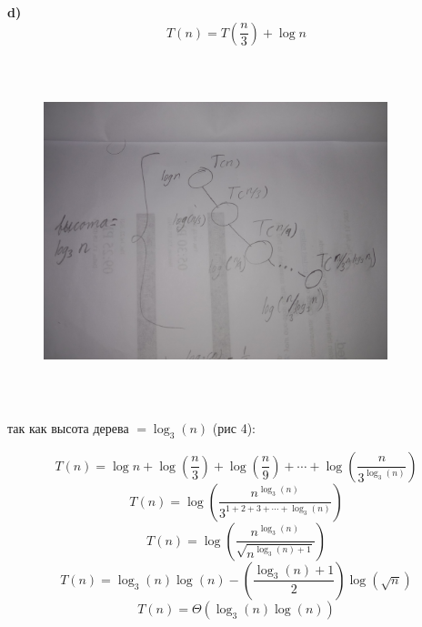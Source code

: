\documentclass{article}
\begin{document}
\bigskip
\bigskip
\textbf{d)}
\begin{equation*}
    T(n) = T\left(\frac{n}{3}\right) + \log n
\end{equation*}


\begin{figure}[h]
    \centering
    \includegraphics[width=10cm, height=10cm]{4.jpg}
    \caption{}
    \label{fig:4}
\end{figure}

\newpage

так как высота дерева $= \log_{3}(n)$ (рис 4):

\begin{equation*}
    T(n) = \log n + \log \left(\dfrac{n}{3}\right) + \log \left(\dfrac{n}{9}\right) + \cdots + \log \left(\dfrac{n}{3^{\log_{3}(n)}} \right)
\end{equation*}
\begin{equation*}
    T(n) = \log \left(\dfrac{n^{\log_{3}(n)}}{3^{1+2+3+\cdots+\log_{3}(n)}}\right)
\end{equation*}
\begin{equation*}
    T(n) = \log \left(\dfrac{n^{\log_{3}(n)}}{\sqrt{n^{\log_{3}(n) + 1}}}\right)
\end{equation*}
\begin{equation*}
    T(n) = \log_{3}(n) \log \left(n\right) - \left(\dfrac{\log_{3}(n) + 1}{2} \right) \log \left(\sqrt{n}\right)
\end{equation*}
\begin{equation*}
    T(n)=\Theta(\log_{3}(n) \log (n))
\end{equation*}
\end{document}
